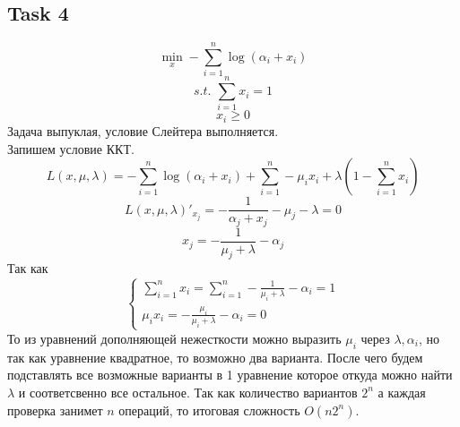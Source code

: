 \documentclass[12pt]{exam}
\begin{document}
\subsection*{Task 4}
$$ \min_x -\sum_{i=1}^n \log (\alpha_i + x_i) $$
$$ \textit{s.t. } \sum_{i=1}^n x_i = 1$$
$$ x_i \geq 0$$
Задача выпуклая, условие Слейтера выполняется. \\
Запишем условие ККТ. \\
$$ 
L(x, \mu, \lambda) = 
-\sum_{i=1}^n \log(\alpha_i + x_i) + 
\sum_{i=1}^n -\mu_i x_i + 
\lambda \left(1 - \sum_{i=1}^n x_i \right)
$$
$$ 
L(x, \mu, \lambda)'_{x_j} = 
-\frac{1}{\alpha_j + x_j} -\mu_j -\lambda = 0  
$$
$$
x_j = -\frac{1}{\mu_j + \lambda} - \alpha_j
$$
Так как 
\begin{equation*}
    \begin{cases}
        \sum_{i=1}^n x_i = \sum_{i=1}^n -\frac{1}{\mu_i + \lambda} - \alpha_i = 1 \\
        \mu_i x_i = -\frac{\mu_i}{\mu_i + \lambda} - \alpha_i = 0        
    \end{cases}
\end{equation*}
То из уравнений дополняющей нежесткости можно выразить $\mu_i$ через $\lambda, \alpha_i$,
но так как уравнение квадратное, то возможно два варианта. 
После чего будем подставлять все возможные варианты в 1 уравнение которое откуда можно найти $\lambda$ и соответсвенно все остальное.
Так как количество вариантов $2^n$ а каждая проверка занимет $n$ операций, то итоговая сложность $O(n2^n)$. 
\end{document}
